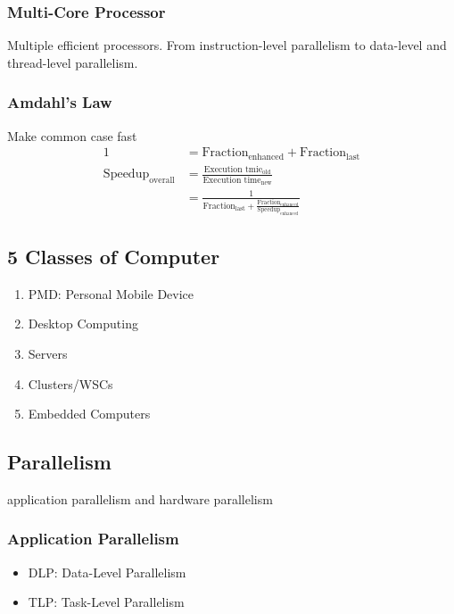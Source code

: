\subsubsection{Multi-Core Processor}
Multiple efficient processors. From instruction-level parallelism to data-level and thread-level parallelism. 

\subsubsection{Amdahl's Law}
Make common case fast
\begin{align*}
    1&=\text{Fraction}_{\text{enhanced}}+\text{Fraction}_{\text{last}}\\
    \text{Speedup}_{\text{overall}}&=\frac{\text{Execution tmie}_{\text{old}}}{\text{Execution time}_{\text{new}}}\\
    &=\frac{1}{\text{Fraction}_{\text{last}}+\frac{\text{Fraction}_{\text{enhanced}}}{\text{Speedup}_{\text{enhanced}}}}
\end{align*}

\subsection{5 Classes of Computer}
\begin{enumerate}
    \item PMD: Personal Mobile Device
    \item Desktop Computing
    \item Servers
    \item Clusters/WSCs
    \item Embedded Computers
\end{enumerate}

\subsection{Parallelism}
application parallelism and hardware parallelism

\subsubsection{Application Parallelism}
\begin{itemize}
    \item DLP: Data-Level Parallelism
    \item TLP: Task-Level Parallelism
\end{itemize}

